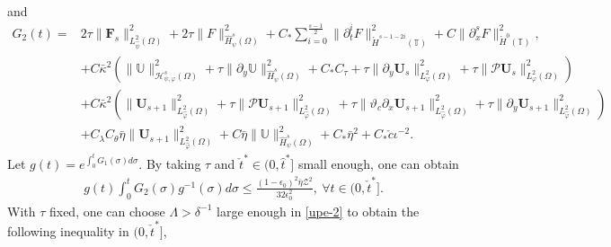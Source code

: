 \documentclass{amsart}
\numberwithin{equation}{section}
\begin{document}
and
\begin{align*}
G_{2}(t)
=&2\tau\|\mathbf{F}_{s}\|_{L_{\hat{\psi}}^{2}(\Omega)}^{2}
     +2\tau\|F\|_{\hat{H}_{\psi}^{s}(\Omega)}^{2}
     +C_{*}\sum_{i=0}^{\frac{s-1}{2}}\|\partial_{t}^{i}F\|_{\mathring{H}^{s-1-2i}(\mathbb{T})}^{2}
     +C\|\partial_{x}^{s}F\|_{\mathring{H}^{0}(\mathbb{T})}^{2},\\
    &+C\bar{\kappa}^{2}\left(\|\mathbb{U}\|_{\mathcal{H}_{\psi,\varphi}^{s}(\Omega)}^{2}
                +\tau\|\partial_{y}\mathbb{U}\|_{\hat{H}_{\psi}^{s}(\Omega)}^{2}
                +C_{*}C_{\tau}
                +\tau\|\partial_{y}\mathbf{U}_{s}\|_{L_{\varphi}^{2}(\Omega)}^{2}
                +\tau\|\mathcal{P}\mathbf{U}_{s}\|_{L_{\varphi}^{2}(\Omega)}^{2}\right)\\
    &+C\bar{\kappa}^{2}\left(\|\mathbf{U}_{s+1}\|_{L_{\hat{\varphi}}^{2}(\Omega)}^{2}
                     +\tau\|\mathcal{P}\mathbf{U}_{s+1}\|_{L_{\hat{\varphi}}^{2}(\Omega)}^{2}
                     +\tau\|\vartheta_{c}\partial_{x}\mathbf{U}_{s+1}\|_{L_{\hat{\varphi}}^{2}(\Omega)}^{2}
                     +\tau\|\partial_{y}\mathbf{U}_{s+1}\|_{L_{\hat{\varphi}}^{2}(\Omega)}^{2}
                     \right)\\
    &+C_{\lambda}C_{\theta}\bar{\eta}\|\mathbf{U}_{s+1}\|_{L_{\hat{\varphi}}^{2}(\Omega)}^{2}
     +C\bar{\eta}\|\mathbb{U}\|_{\hat{H}_{\psi}^{s}(\Omega)}^{2}
     +C_{*}\bar{\eta}^{2}
     +C_{*}\check{c}\iota^{-2}\nonumber.
\end{align*}
Let $g(t)=e^{\int_{0}^{t}G_{1}(\sigma)d\sigma}$. By taking $\tau$ and $\check{t}^{*}\in(0,\hat{t}^{*}]$ small enough, one can obtain
\begin{align}\label{G2}
g(t)\int_{0}^{t}G_{2}(\sigma)g^{-1}(\sigma)d\sigma
\leq \frac{(1-\epsilon_{0})^{2}\bar{\eta}\mathcal{Z}^{2}}{32\epsilon_{0}^{2}},~\forall t\in(0,\check{t}^{*}].
\end{align}
With $\tau$ fixed, one can choose $\Lambda>\delta^{-1}$ large enough in \eqref{upe-2} to obtain the following inequality in $(0,\check{t}^{*}]$,
\end{document}
